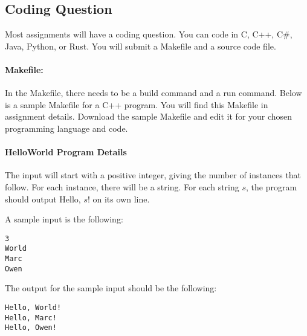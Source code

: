 \documentclass[solutionorbox,answers]{exam}
\begin{document}
\begin{questions}

\section*{Coding Question}

Most assignments will have a coding question. You can code in C, C++, C\#, Java, Python, or Rust. You will submit a Makefile and a source code file.
\vspace{-0.5cm}

\paragraph{Makefile:} In the Makefile, there needs to be a build command and a run command. Below is a sample Makefile for a C++ program. You will find this Makefile in assignment details. Download the sample Makefile and edit it for your chosen programming language and code.



\paragraph{HelloWorld Program Details}

The input will start with a positive integer, giving the number of instances that follow. For each instance, there will be a string. For each string $s$, the program should output Hello, $s$! on its own line.

A sample input is the following:
\begin{verbatim}
3
World
Marc
Owen
\end{verbatim}

The output for the sample input should be the following:
\begin{verbatim}
Hello, World!
Hello, Marc!
Hello, Owen!
\end{verbatim}

\end{questions}
\end{document}
